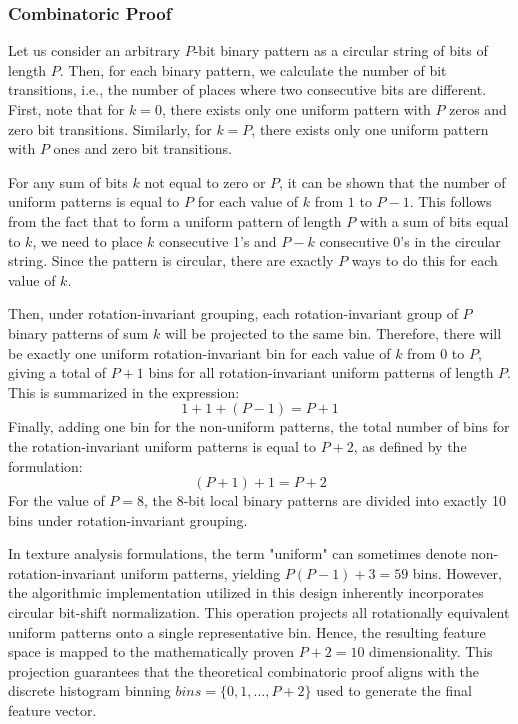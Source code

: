 \subsubsection*{Combinatoric Proof}
Let us consider an arbitrary $P$-bit binary pattern as a circular string of bits of length $P$. Then, for each binary pattern, we calculate the number of bit transitions, i.e., the number of places where two consecutive bits are different. First, note that for $k=0$, there exists only one uniform pattern with $P$ zeros and zero bit transitions. Similarly, for $k=P$, there exists only one uniform pattern with $P$ ones and zero bit transitions.

For any sum of bits $k$ not equal to zero or $P$, it can be shown that the number of uniform patterns is equal to $P$ for each value of $k$ from $1$ to $P-1$. This follows from the fact that to form a uniform pattern of length $P$ with a sum of bits equal to $k$, we need to place $k$ consecutive 1's and $P-k$ consecutive 0's in the circular string. Since the pattern is circular, there are exactly $P$ ways to do this for each value of $k$.

Then, under rotation-invariant grouping, each rotation-invariant group of $P$ binary patterns of sum $k$ will be projected to the same bin. Therefore, there will be exactly one uniform rotation-invariant bin for each value of $k$ from $0$ to $P$, giving a total of $P+1$ bins for all rotation-invariant uniform patterns of length $P$. This is summarized in the expression:
\begin{equation}
1 + 1 + (P - 1) = P + 1 \label{eq:uniform_lbp_classes}
\end{equation}
Finally, adding one bin for the non-uniform patterns, the total number of bins for the rotation-invariant uniform patterns is equal to $P+2$, as defined by the formulation:
\begin{equation}
(P + 1) + 1 = P + 2 \label{eq:total_lbp_classes}
\end{equation}
For the value of $P=8$, the 8-bit local binary patterns are divided into exactly 10 bins under rotation-invariant grouping. 

In texture analysis formulations, the term "uniform" can sometimes denote {\footnotesize non-rotation-invariant} uniform patterns, yielding $P(P-1) + 3 = 59$ bins. However, the algorithmic implementation utilized in this design inherently incorporates circular bit-shift normalization. This operation projects all rotationally equivalent uniform patterns onto a single representative bin. Hence, the resulting feature space is mapped to the mathematically proven $P + 2 = 10$ dimensionality. This projection guarantees that the theoretical combinatoric proof aligns with the discrete histogram binning $bins = \{0, 1, \dots, P+2\}$ used to generate the final feature vector.


